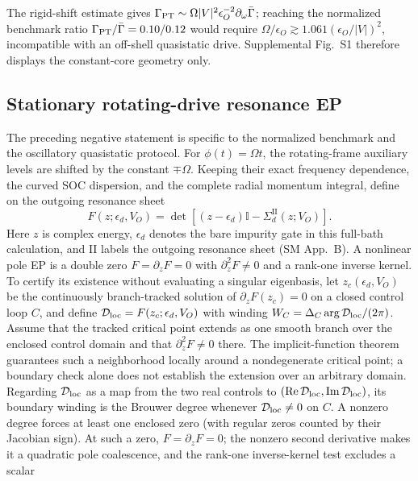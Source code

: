 \documentclass[%
  aps,physrev,onecolumn,10pt,amsmath,amssymb,superscriptaddress,longbibliography,floatfix
]{revtex4-2}
\begin{document}
The rigid-shift estimate gives $\Gamma_{\rm PT}\sim\Omega|V|^2\epsilon_O^{-2}\partial_\omega\bar\Gamma$; reaching the normalized benchmark ratio $\Gamma_{\rm PT}/\bar\Gamma=0.10/0.12$ would require $\Omega/\epsilon_O\gtrsim1.061(\epsilon_O/|V|)^2$, incompatible with an off-shell quasistatic drive.  Supplemental Fig.~S1 therefore displays the constant-core geometry only.

\subsection{Stationary rotating-drive resonance EP}
\label{sec:causal_ep}
The preceding negative statement is specific to the normalized benchmark
and the oscillatory quasistatic protocol.  For $\phi(t)=\Omega t$, the
rotating-frame auxiliary levels are shifted by the constant $\mp\Omega$.
Keeping their exact frequency dependence, the curved SOC dispersion, and
the complete radial momentum integral, define on the outgoing resonance
sheet
\begin{equation}
F(z;\epsilon_d,V_O)=
\det\!\left[(z-\epsilon_d)\mathbb I-
\Sigma_d^{\mathrm{II}}(z;V_O)\right] .
\label{eq:full_k_pole_determinant}
\end{equation}
Here $z$ is complex energy, $\epsilon_d$ denotes the bare impurity gate in
this full-bath calculation, and II labels the outgoing resonance sheet
(SM App.~B).  A nonlinear pole EP is a double zero
$F=\partial_zF=0$ with $\partial_z^2F\neq0$ and a rank-one inverse kernel.
To certify its existence without evaluating a singular eigenbasis, let
$z_c(\epsilon_d,V_O)$ be the continuously branch-tracked solution of
$\partial_zF(z_c)=0$ on a closed control loop $C$, and define ${\cal D}_{\rm loc}=F(z_c;\epsilon_d,V_O)$ with winding $W_C=\Delta_C\arg{\cal D}_{\rm loc}/(2\pi)$.
Assume that the tracked critical point extends as one smooth branch over
the enclosed control domain and that $\partial_z^2F\neq0$ there.  The
implicit-function theorem guarantees such a neighborhood locally around a
nondegenerate critical point; a boundary check alone does not establish the
extension over an arbitrary domain.  Regarding ${\cal D}_{\rm loc}$
as a map from the two real controls to $(\operatorname{Re}{\cal D}_{\rm loc},
\operatorname{Im}{\cal D}_{\rm loc})$, its boundary winding is the Brouwer
degree whenever ${\cal D}_{\rm loc}\neq0$ on $C$.  A nonzero degree forces at
least one enclosed zero (with regular zeros counted by their Jacobian sign).
At such a zero,
$F=\partial_zF=0$; the nonzero second derivative makes it a quadratic pole
coalescence, and the rank-one inverse-kernel test excludes a scalar
\end{document}
